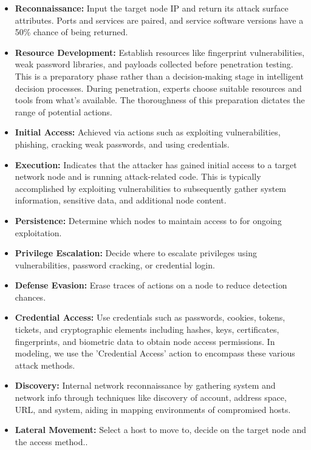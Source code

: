 \begin{itemize}
    \item \textbf{Reconnaissance:} Input the target node IP and return its attack surface attributes. Ports and services are paired, and service software versions have a 50\% chance of being returned.
    \item \textbf{Resource Development:} Establish resources like fingerprint vulnerabilities, weak password libraries, and payloads collected before penetration testing. This is a preparatory phase rather than a decision-making stage in intelligent decision processes. During penetration, experts choose suitable resources and tools from what's available. The thoroughness of this preparation dictates the range of potential actions.
    \item \textbf{Initial Access:} Achieved via actions such as exploiting vulnerabilities, phishing, cracking weak passwords, and using credentials.
    \item \textbf{Execution:} Indicates that the attacker has gained initial access to a target network node and is running attack-related code. This is typically accomplished by exploiting vulnerabilities to subsequently gather system information, sensitive data, and additional node content.
    \item \textbf{Persistence:} Determine which nodes to maintain access to for ongoing exploitation.
    \item \textbf{Privilege Escalation:} Decide where to escalate privileges using vulnerabilities, password cracking, or credential login.
    \item \textbf{Defense Evasion:} Erase traces of actions on a node to reduce detection chances.
    \item \textbf{Credential Access:} Use credentials such as passwords, cookies, tokens, tickets, and cryptographic elements including hashes, keys, certificates, fingerprints, and biometric data to obtain node access permissions. In modeling, we use the 'Credential Access' action to encompass these various attack methods.
    \item \textbf{Discovery:} Internal network reconnaissance by gathering system and network info through techniques like discovery of account, address space, URL, and system, aiding in mapping environments of compromised hosts. 
    \item \textbf{Lateral Movement:} Select a host to move to, decide on the target node and the access method..

\end{itemize}
